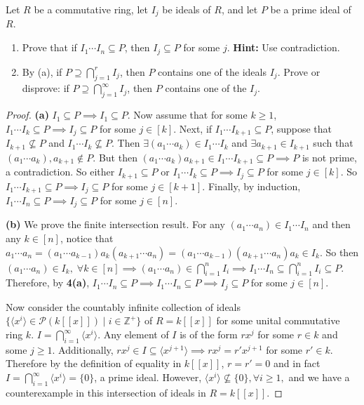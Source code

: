 \documentclass[addpoints,10pt]{exam}
\theoremstyle{plain}
\theoremstyle{definition}
\newtheorem{prob}[thm]{Problem}
\theoremstyle{plain}
\theoremstyle{plain}
\theoremstyle{definition}
\let\oldprob\prob
\let\endoldprob\endprob
\renewenvironment{prob}
  {\begin{singlespace}\oldprob}
  {\endoldprob\end{singlespace}}
\newcommand{\ZZ}{\ensuremath{\mathbb{Z}}}
\newcommand{\tbf}[1]{\textbf{ #1 }}
\begin{document}
\newpage
\begin{prob}
Let $R$ be a commutative ring, let $I_j$ be ideals of $R$, and let $P$ be a prime ideal of $R$.
\begin{enumerate}[label=(\alph*)]
\item Prove that if $I_1 \cdots I_n \subseteq P$, then $I_j \subseteq P$ for some $j$. \tbf{Hint:} Use contradiction.
\item By (a), if $P \supseteq \bigcap_{j=1}^r I_j$, then $P$ contains one of the ideals $I_j$. Prove or disprove: if $P \supseteq \bigcap_{j=1}^\infty I_j$, then $P$ contains one of the $I_j$.
\end{enumerate}
\end{prob}
\begin{proof}
\textbf{(a)} $I_{1}\subseteq P\implies I_{1}\subseteq P$. Now assume that for some $k\geq 1$, $I_{1}\cdots I_{k}\subseteq P\implies I_{j}\subseteq P$ for some $j\in [k]$. Next, if $I_{1}\cdots I_{k+1}\subseteq P$, suppose that $I_{k+1}\not\subseteq P$ and $I_{1}\cdots I_{k}\not\subseteq P.$ Then $\exists (a_{1}\cdots a_{k})\in I_{1}\cdots I_{k}$ and $\exists a_{k+1} \in I_{k+1}$ such that $(a_{1}\cdots a_{k}),a_{k+1}\notin P.$ But then $(a_{1}\cdots a_{k})a_{k+1}\in I_{1}\cdots I_{k+1}\subseteq P\implies P$ is not prime, a contradiction. So either $I_{k+1}\subseteq P$ or $I_{1}\cdots I_{k}\subseteq P\implies I_{j}\subseteq P$ for some $j\in [k]$. So $I_{1}\cdots I_{k+1}\subseteq P\implies I_{j}\subseteq P$ for some $j\in [k+1]$. Finally, by induction, $I_{1}\cdots I_{n}\subseteq P\implies I_{j}\subseteq P$ for some $j\in [n]$.

\textbf{(b)} We prove the finite intersection result. For any $(a_{1}\cdots a_{n})\in I_{1}\cdots I_{n}$ and then any $k\in [n]$, notice that $a_{1}\cdots a_{n}=(a_{1}\cdots a_{k-1})a_{k}(a_{k+1}\cdots a_{n})=(a_{1}\cdots a_{k-1})(a_{k+1}\cdots a_{n})a_{k}\in I_{k}.$ So then $(a_{1}\cdots a_{n})\in I_{k},\;\forall k\in [n]\implies (a_{1}\cdots a_{n})\in \bigcap_{i=1}^{n} I_{i}\implies I_{1}\cdots I_{n}\subseteq \bigcap_{i=1}^{n} I_{i}\subseteq P.$ Therefore, by \textbf{4(a)}, $I_{1}\cdots I_{n}\subseteq P\implies I_{1}\cdots I_{n}\subseteq P\implies I_{j}\subseteq P$ for some $j\in [n]$.

Now consider the countably infinite collection of ideals $\{\langle x^{i}\rangle\in \mathcal{P}(k[[x]])\mid i\in \ZZ^{+}\}$ of $R=k[[x]]$ for some unital commutative ring $k$. $I=\bigcap_{i=1}^{\infty} \langle x^{i}\rangle.$ Any element of $I$ is of the form $rx^{j}$ for some $r\in k$ and some $j\geq 1$. Additionally, $rx^{j}\in I\subseteq \langle x^{j+1}\rangle\implies rx^{j}=r'x^{j+1}$ for some $r'\in k$. Therefore by the definition of equality in $k[[x]]$, $r=r'=0$ and in fact $I=\bigcap_{i=1}^{\infty} \langle x^{i}\rangle=\{0\}$, a prime ideal. However, $\langle x^{i}\rangle \not\subseteq \{0\}, \forall i\geq 1,$ and we have a counterexample in this intersection of ideals in $R=k[[x]]$. 

\end{proof}
\end{document}
